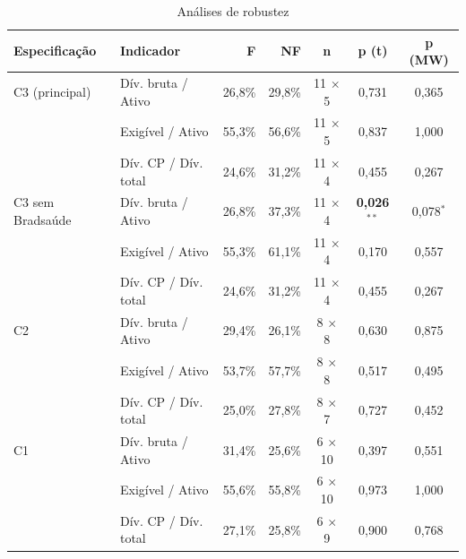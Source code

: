 \begin{table}[htb]
\caption{Análises de robustez}\label{tab:robustez}
\centering\footnotesize\setlength{\tabcolsep}{4pt}
\begin{tabular}{llrrccc}
\toprule
Especificação & Indicador & F & NF & n & p (t) & p (MW) \\
\midrule
C3 (principal) & Dív. bruta / Ativo & 26,8\% & 29,8\% & 11 $\times$ 5 & 0,731 & 0,365 \\
 & Exigível / Ativo & 55,3\% & 56,6\% & 11 $\times$ 5 & 0,837 & 1,000 \\
 & Dív. CP / Dív. total & 24,6\% & 31,2\% & 11 $\times$ 4 & 0,455 & 0,267 \\
C3 sem Bradsaúde & Dív. bruta / Ativo & 26,8\% & 37,3\% & 11 $\times$ 4 & \textbf{0,026}$^{**}$ & 0,078$^{*}$ \\
 & Exigível / Ativo & 55,3\% & 61,1\% & 11 $\times$ 4 & 0,170 & 0,557 \\
 & Dív. CP / Dív. total & 24,6\% & 31,2\% & 11 $\times$ 4 & 0,455 & 0,267 \\
C2 & Dív. bruta / Ativo & 29,4\% & 26,1\% & 8 $\times$ 8 & 0,630 & 0,875 \\
 & Exigível / Ativo & 53,7\% & 57,7\% & 8 $\times$ 8 & 0,517 & 0,495 \\
 & Dív. CP / Dív. total & 25,0\% & 27,8\% & 8 $\times$ 7 & 0,727 & 0,452 \\
C1 & Dív. bruta / Ativo & 31,4\% & 25,6\% & 6 $\times$ 10 & 0,397 & 0,551 \\
 & Exigível / Ativo & 55,6\% & 55,8\% & 6 $\times$ 10 & 0,973 & 1,000 \\
 & Dív. CP / Dív. total & 27,1\% & 25,8\% & 6 $\times$ 9 & 0,900 & 0,768 \\
\bottomrule
\end{tabular}
\end{table}
